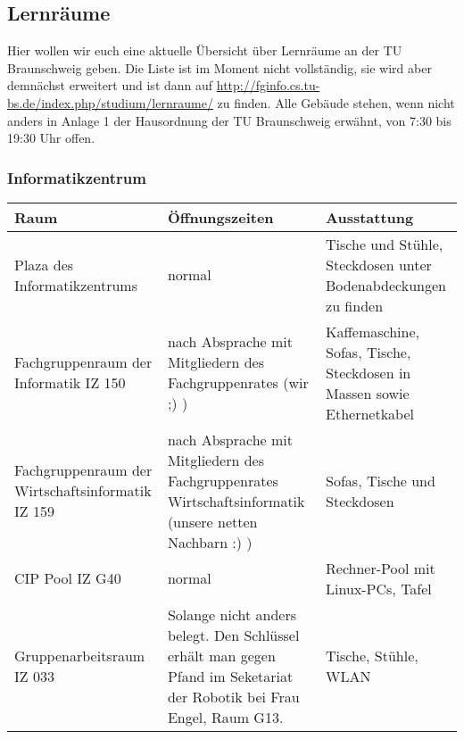 \subsection{Lernräume}
	Hier wollen wir euch eine aktuelle Übersicht über Lernräume an der TU Braunschweig geben. Die Liste ist im Moment nicht vollständig, sie wird aber demnächst erweitert und ist dann auf \url{http://fginfo.cs.tu-bs.de/index.php/studium/lernraume/} zu finden. Alle Gebäude stehen, wenn nicht anders in Anlage 1 der Hausordnung der TU Braunschweig erwähnt, von 7:30 bis 19:30 Uhr offen.
	\subsubsection*{Informatikzentrum}
		\begin{tabular}{|p{4cm}|p{5cm}|p{8cm}|}
			\hline Raum & Öffnungszeiten & Ausstattung \\ 
			\hline Plaza des Informatikzentrums & normal &  Tische und Stühle, Steckdosen unter Bodenabdeckungen zu finden \\
			\hline Fachgruppenraum der Informatik IZ 150 &
			nach Absprache mit Mitgliedern des
			Fachgruppenrates (wir ;) ) & Kaffemaschine, Sofas, Tische, Steckdosen in Massen sowie Ethernetkabel\\ 
			\hline Fachgruppenraum der Wirtschaftsinformatik
			IZ 159 & nach Absprache mit Mitgliedern des
			Fachgruppenrates Wirtschaftsinformatik (unsere
			netten Nachbarn :) )& Sofas, Tische und Steckdosen \\ 
			\hline CIP Pool IZ G40 & normal & Rechner-Pool mit Linux-PCs, Tafel\\ 
			\hline Gruppenarbeitsraum IZ 033 & 
			
			Solange nicht anders belegt. Den Schlüssel
			erhält man gegen Pfand im Seketariat der Robotik bei Frau Engel,
			Raum G13.
			 &
			Tische, Stühle, WLAN
			\\
			\hline
		\end{tabular}
